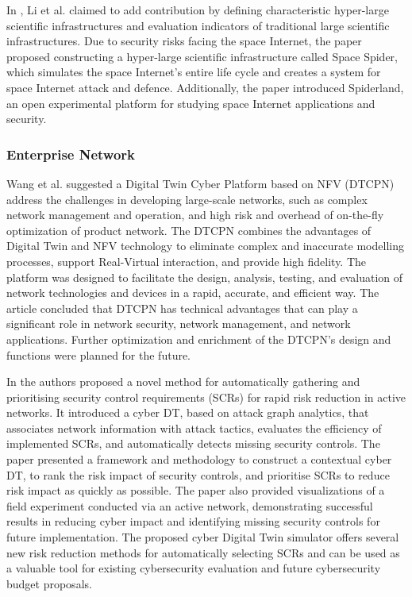 In \cite{jiaqiliSpaceSpiderHyper2022}, Li et al. claimed to add contribution by defining characteristic hyper-large scientific infrastructures and evaluation indicators of traditional large scientific infrastructures. Due to security risks facing the space Internet, the paper proposed constructing a hyper-large scientific infrastructure called Space Spider, which simulates the space Internet's entire life cycle and creates a system for space Internet attack and defence. Additionally, the paper introduced Spiderland, an open experimental platform for studying space Internet applications and security.

\subsubsection*{Enterprise Network}
 Wang et al.\cite{wangDTCPNDigitalTwin2022} suggested a Digital Twin Cyber Platform based on NFV (DTCPN) address the challenges in developing large-scale networks, such as complex network management and operation, and high risk and overhead of on-the-fly optimization of product network. The DTCPN combines the advantages of Digital Twin and NFV technology to eliminate complex and inaccurate modelling processes, support Real-Virtual interaction, and provide high fidelity. The platform was designed to facilitate the design, analysis, testing, and evaluation of network technologies and devices in a rapid, accurate, and efficient way. The article concluded that DTCPN has technical advantages that can play a significant role in network security, network management, and network applications. Further optimization and enrichment of the DTCPN's design and functions were planned for the future.

In \cite{hadarCyberDigitalTwin2020} the authors proposed a novel method for automatically gathering and prioritising security control requirements (SCRs) for rapid risk reduction in active networks. It introduced a cyber DT, based on attack graph analytics, that associates network information with attack tactics, evaluates the efficiency of implemented SCRs, and automatically detects missing security controls. The paper presented a framework and methodology to construct a contextual cyber DT, to rank the risk impact of security controls, and prioritise SCRs to reduce risk impact as quickly as possible. The paper also provided visualizations of a field experiment conducted via an active network, demonstrating successful results in reducing cyber impact and identifying missing security controls for future implementation. The proposed cyber Digital Twin simulator offers several new risk reduction methods for automatically selecting SCRs and can be used as a valuable tool for existing cybersecurity evaluation and future cybersecurity budget proposals.

